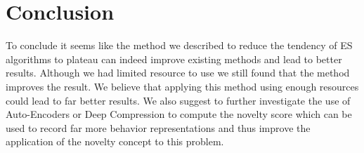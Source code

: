\documentclass[11 pt, twocolumn]{article}
\begin{document}
\section{Conclusion}
To conclude it seems like the method we described to reduce the tendency of ES algorithms to plateau can indeed improve existing methods and lead to better results. Although we had limited resource to use we still found that the method improves the result. We believe that applying this method using enough resources could lead to far better results. We also suggest to further investigate the use of Auto-Encoders or Deep Compression to compute the novelty score which can be used to record far more behavior representations and thus improve the application of the novelty concept to this problem.

 

\end{document}
